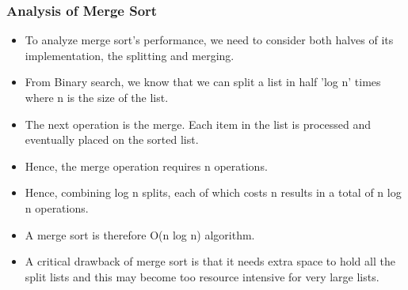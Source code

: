 \documentclass{beamer}
\begin{document}
\begin{frame}
\frametitle{Analysis of Merge Sort}
\begin{itemize}
\item To analyze merge sort's performance, we need to consider both halves of its implementation, the splitting and merging.
\item From Binary search, we know that we can split a list in half 'log n' times where n is the size of the  list.
\item The next operation is the merge. Each item in the list is processed and eventually placed on the sorted list. 
\item Hence, the merge operation requires n operations.
\item Hence, combining log n splits, each of which costs n results in a total of n log n operations.
\item A merge sort is therefore O(n log n) algorithm. 
\item A critical drawback of merge sort is that it needs extra space to hold all the split lists and this may become too resource intensive for very large lists.
\end{itemize}
\end{frame}
\end{document}
